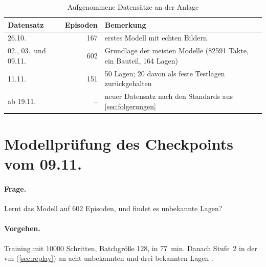 \begin{table}[htbp]
  \centering
  \caption{Aufgenommene Datensätze an der Anlage}
  \label{tab:datensaetze}
  \small
  \begin{tabularx}{\textwidth}{@{}l r X@{}}
    \toprule
    Datensatz & Episoden & Bemerkung \\
    \midrule
    26.10. & 167 & erstes Modell mit echten Bildern \\
    02., 03.\ und 09.11. & 602 & Grundlage der meisten Modelle (\SI{82591}{} Takte, ein Bauteil,
      164 Lagen) \\
    11.11. & 151 & 50 Lagen; 20 davon als feste Testlagen zurückgehalten \\
    ab 19.11. & -- & neuer Datensatz nach den Standards aus \cref{sec:folgerungen} \\
    \bottomrule
  \end{tabularx}
\end{table}

\section{Modellprüfung des Checkpoints vom 09.11.}
\label{sec:modellpruefung}

\paragraph{Frage.} Lernt das Modell auf 602 Episoden, und findet es unbekannte Lagen?

\paragraph{Vorgehen.} Training mit \num{10000} Schritten, Batchgröße 128, in \SI{77}{\minute}.
Danach Stufe~2 in der \ac{vm} (\cref{sec:replay}) an acht unbekannten und drei bekannten Lagen
.

